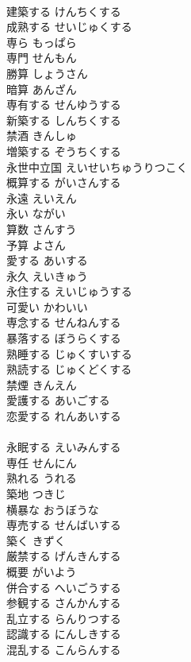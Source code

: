 \documentclass[8pt]{extreport}
\begin{document}
\begin{CJK}{UTF8}{min}
\\	建築する	けんちくする	
\\	成熟する	せいじゅくする	
\\	専ら	もっぱら	
\\	専門	せんもん	
\\	勝算	しょうさん	
\\	暗算	あんざん	
\\	専有する	せんゆうする	
\\	新築する	しんちくする	
\\	禁酒	きんしゅ	
\\	増築する	ぞうちくする	
\\	永世中立国	えいせいちゅうりつこく	
\\	概算する	がいさんする	
\\	永遠	えいえん	
\\	永い	ながい	
\\	算数	さんすう	
\\	予算	よさん	
\\	愛する	あいする	
\\	永久	えいきゅう	
\\	永住する	えいじゅうする	
\\	可愛い	かわいい	
\\	専念する	せんねんする	
\\	暴落する	ぼうらくする	
\\	熟睡する	じゅくすいする	
\\	熟読する	じゅくどくする	
\\	禁煙	きんえん	
\\	愛護する	あいごする	
\\	恋愛する	れんあいする	
\\	[漢語]
\\	永眠する	えいみんする	
\\	専任	せんにん	
\\	熟れる	うれる	
\\	築地	つきじ	
\\	横暴な	おうぼうな	
\\	専売する	せんばいする	
\\	築く	きずく	
\\	厳禁する	げんきんする	
\\	概要	がいよう	
\\	併合する	へいごうする	
\\	参観する	さんかんする	
\\	乱立する	らんりつする	
\\	認識する	にんしきする	
\\	混乱する	こんらんする	

\end{CJK}
\end{document}
